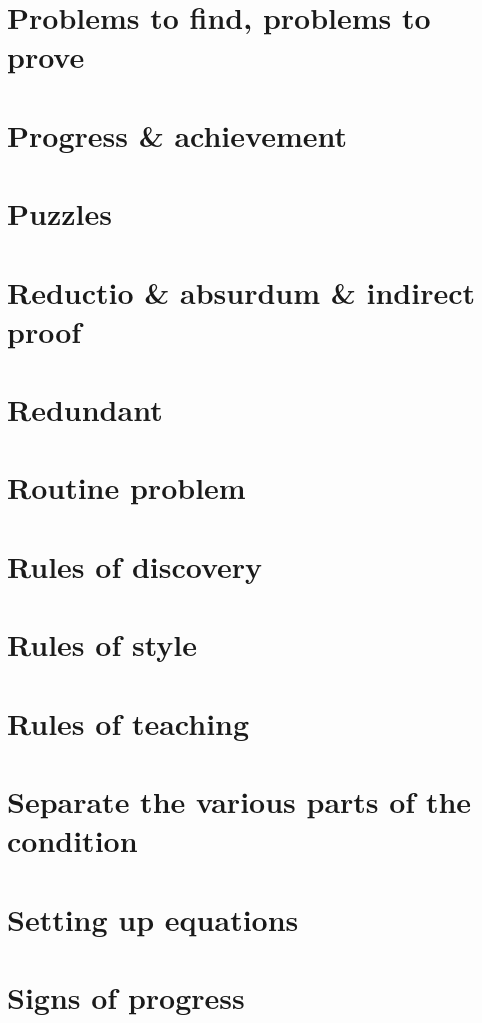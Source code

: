\documentclass[oneside]{book}
\numberwithin{equation}{section}
\begin{document}
\section{Problems to find, problems to prove}

\section{Progress \& achievement}

\section{Puzzles}

\section{Reductio \& absurdum \& indirect proof}

\section{Redundant}

\section{Routine problem}

\section{Rules of discovery}

\section{Rules of style}

\section{Rules of teaching}

\section{Separate the various parts of the condition}

\section{Setting up equations}

\section{Signs of progress}
\end{document}
